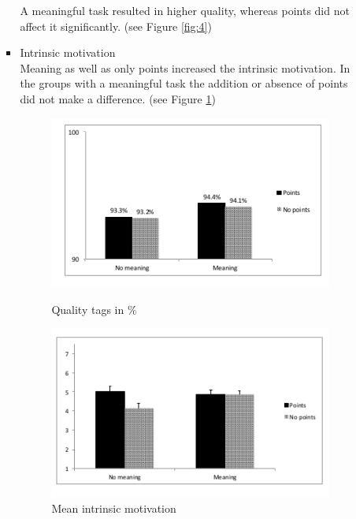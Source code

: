 \documentclass{article}
\theoremstyle{definition}
\theoremstyle{remark}
\begin{document}
\begin{itemize}
\begin{itemize}
\begin{itemize}
            A meaningful task resulted in higher quality, whereas points did not affect it significantly. (see Figure \ref{fig:4})
            \item Intrinsic motivation\\
            Meaning as well as only points increased the intrinsic motivation. In the groups with a meaningful task the addition or absence of points did not make a difference. (see Figure \ref{fig:6})
            \begin{figure}[ht!]
                \centering
                \begin{minipage}[b]{0.5\textwidth}
                \includegraphics[width=1\textwidth]{images/Figure4_gamification.png}
                \caption{Quality tags in \% \cite{disassembling_gamification}}
                \label{fig:4} 
                \end{minipage}
                \begin{minipage}[b]{0.49\textwidth}
                \includegraphics[width=1\textwidth]{images/Figure6_gamification.png}
                \caption{Mean intrinsic motivation \cite{disassembling_gamification}}
                \label{fig:6}
                 \end{minipage}
            \end{figure}
        \end{itemize}
    \end{itemize}
    

\end{itemize}
\end{document}

